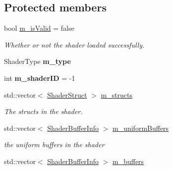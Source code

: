 \subsection*{Protected members}
\begin{DoxyCompactItemize}
\item 
\mbox{\label{classrev_1_1_shader_a685ccbc6bd16846e88cd3e35b55b0db2}} 
bool \mbox{\hyperlink{classrev_1_1_shader_a685ccbc6bd16846e88cd3e35b55b0db2}{m\+\_\+is\+Valid}} = false
\begin{DoxyCompactList}\small\item\em Whether or not the shader loaded successfully. \end{DoxyCompactList}\item 
\mbox{\label{classrev_1_1_shader_aa0e1dbd264f845baed9abbb444cac837}} 
Shader\+Type {\bfseries m\+\_\+type}
\item 
\mbox{\label{classrev_1_1_shader_a47714b83fadf16b9eeb46b6bf08dd1b3}} 
int {\bfseries m\+\_\+shader\+ID} = -\/1
\item 
\mbox{\label{classrev_1_1_shader_a768e5b37748b8ba762bbdb599c9786f9}} 
std\+::vector$<$ \mbox{\hyperlink{structrev_1_1_shader_struct}{Shader\+Struct}} $>$ \mbox{\hyperlink{classrev_1_1_shader_a768e5b37748b8ba762bbdb599c9786f9}{m\+\_\+structs}}
\begin{DoxyCompactList}\small\item\em The structs in the shader. \end{DoxyCompactList}\item 
\mbox{\label{classrev_1_1_shader_a73fb13e04430db30f8433f7f27e061e2}} 
std\+::vector$<$ \mbox{\hyperlink{structrev_1_1_shader_buffer_info}{Shader\+Buffer\+Info}} $>$ \mbox{\hyperlink{classrev_1_1_shader_a73fb13e04430db30f8433f7f27e061e2}{m\+\_\+uniform\+Buffers}}
\begin{DoxyCompactList}\small\item\em the uniform buffers in the shader \end{DoxyCompactList}\item 
\mbox{\label{classrev_1_1_shader_af5f12dbbd85b4503c2475a0094b81b73}} 
std\+::vector$<$ \mbox{\hyperlink{structrev_1_1_shader_buffer_info}{Shader\+Buffer\+Info}} $>$ \mbox{\hyperlink{classrev_1_1_shader_af5f12dbbd85b4503c2475a0094b81b73}{m\+\_\+buffers}}

\end{DoxyCompactItemize}
